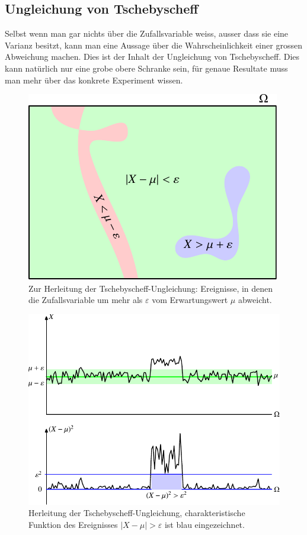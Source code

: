 \subsection{Ungleichung von Tschebyscheff} \label{ungleichung-von-tschebyscheff}
Selbst wenn man gar nichts über die Zufallsvariable weiss, ausser
dass sie eine Varianz besitzt, kann man eine Aussage über die 
Wahrscheinlichkeit einer grossen Abweichung machen.
Dies ist der Inhalt der Ungleichung von Tschebyscheff.
Dies kann natürlich
nur eine grobe obere Schranke sein, für genaue Resultate muss man
mehr über das konkrete Experiment wissen.
\begin{figure}
\centering
\includegraphics{images/erwartung-5.pdf}
\caption{Zur Herleitung der Tschebyscheff-Ungleichung: Ereignisse, in denen 
die Zufallsvariable um mehr als $\varepsilon$ vom Erwartungswert $\mu$
abweicht.
\label{tschebyscheff-herleitung}}
\end{figure}
\begin{figure}
\centering
\includegraphics{images/erwartung-6.pdf}
\caption{Herleitung der Tschebyscheff-Ungleichung, charakteristische Funktion
des Ereignisses $|X-\mu|>\varepsilon$ ist blau eingezeichnet.
\label{tschebyscheff2}}
\end{figure}

